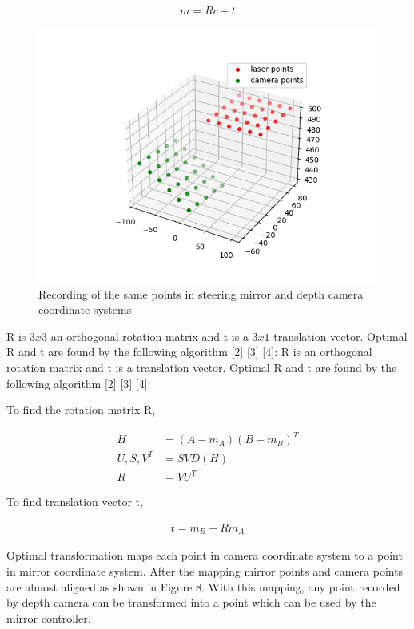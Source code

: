 \begin{align*}
    m = R c + t
\end{align*}


\begin{figure}[!htb]\centering
    \includegraphics*[width = 16cm]{bilder/project/mapping1.png}
    \caption{Recording of the same points in steering mirror and depth camera coordinate systems }
    \label{fig:mapping1}
\end{figure}


R is $3x3$ an orthogonal rotation matrix and t is a $3x1$ translation 
vector. Optimal R and t are found by the following algorithm [2] [3] [4]:
R is an orthogonal rotation matrix and t is a translation vector. 
Optimal R and t are found by the following algorithm [2] [3] [4]:


To find the rotation matrix R,

\begin{align*}
    H &= (A-m_{A})(B-m_{B})^{T} \\
    U, S, V^{T} &= SVD(H) \\
    R &= VU^{T}
\end{align*}


To find translation vector t,

\begin{align*}
    t = m_{B} - R m_{A}
\end{align*}



Optimal transformation maps each point in camera coordinate 
system to a point in mirror coordinate system. After the 
mapping mirror points and camera points are almost aligned 
as shown in Figure 8. With this mapping, any point recorded 
by depth camera can be transformed into a point which can be 
used by the mirror controller.


